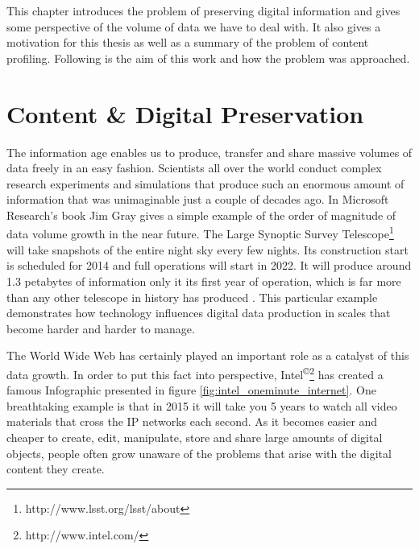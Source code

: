 This chapter introduces the problem of preserving digital information and gives some perspective of the volume of data we have to deal with. It also gives a motivation for this thesis as well as a summary of the problem of content profiling. Following is the aim of this work and how the problem was approached.

\section{Content \& Digital Preservation}
\label{ch:content_and_digital_preservation}
The information age enables us to produce, transfer and share massive volumes of data freely in an easy fashion. Scientists all over the world conduct complex research experiments and simulations that produce such an enormous amount of information that was unimaginable just a couple of decades ago. In Microsoft Research's book Jim Gray gives a simple example of the order of magnitude of data volume growth in the near future. The Large Synoptic Survey Telescope\footnote{http://www.lsst.org/lsst/about} will take snapshots of the entire night sky every few nights. Its construction start is scheduled for 2014 and full operations will start in 2022. It will produce around 1.3 petabytes of information only it its first year of operation, which is far more than any other telescope in history has produced \cite{Gray:2009:fourthparadigm}. This particular example demonstrates how technology influences digital data production in scales that become harder and harder to manage.

The World Wide Web has certainly played an important role as a catalyst of this data growth. In order to put this fact into perspective, Intel\textsuperscript{\copyright}\footnote{http://www.intel.com/} has created a famous Infographic presented in figure \ref{fig:intel_oneminute_internet}. One breathtaking example is that in 2015 it will take you 5 years to watch all video materials that cross the IP networks each second.
As it becomes easier and cheaper to create, edit, manipulate, store and share large amounts of digital objects, people often grow unaware of the problems that arise with the digital content they create.

